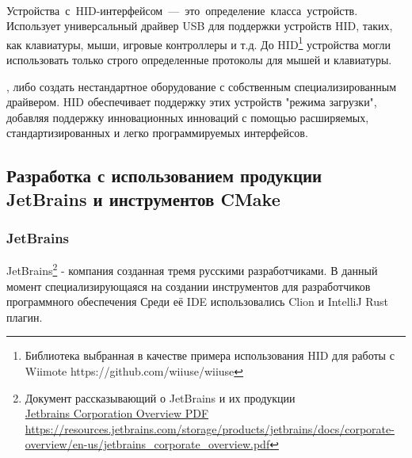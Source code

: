 \quad {}\\
\mbox{Устройства с HID-интерфейсом — это определение класса устройств}.
Использует универсальный драйвер USB для поддержки устройств HID, таких, как клавиатуры, мыши, игровые контроллеры и т.д.
До HID\footnote{Библиотека выбранная в качестве примера использования HID для работы с Wiimote https://github.com/wiiuse/wiiuse} устройства могли использовать только строго определенные протоколы для мышей и клавиатуры.\par
{}, либо создать нестандартное оборудование с собственным специализированным драйвером.
HID обеспечивает поддержку этих устройств "режима загрузки", добавляя поддержку инновационных инноваций с помощью расширяемых, стандартизированных и легко программируемых интерфейсов.


\subsection{Разработка с использованием продукции JetBrains и инструментов CMake}
\subsubsection{JetBrains}

\quad JetBrains\footnote{Документ рассказывающий о JetBrains и их продукции \\ \href{https://resources.jetbrains.com/storage/products/jetbrains/docs/corporate-overview/en-us/jetbrains_corporate_overview.pdf}{Jetbrains Corporation Overview PDF https://resources.jetbrains.com/storage/products/jetbrains/docs/corporate-overview/en-us/jetbrains\_corporate\_overview.pdf}}
- компания созданная тремя русскими разработчиками.
В данный момент специализирующаяся на создании инструментов для разработчиков программного обеспечения
Среди её IDE использовались Clion и IntelliJ Rust плагин\@.
